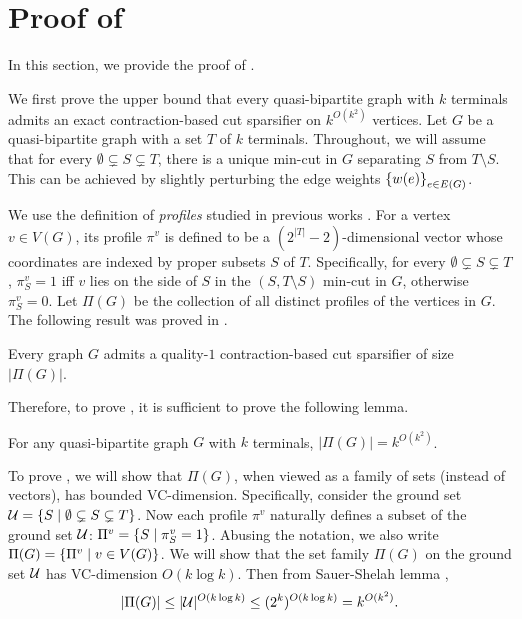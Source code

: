 \section{Proof of }
\label{sec: quasi_exact}

In this section, we provide the proof of . 

We first prove the upper bound that every quasi-bipartite graph with $k$ terminals admits an exact contraction-based cut sparsifier on $k^{O(k^2)}$ vertices. 
Let $G$ be a quasi-bipartite graph with a set $T$ of $k$ terminals.
Throughout, we will assume that for every $\emptyset \subsetneq S\subsetneq T$, there is a unique min-cut in $G$ separating $S$ from $T\setminus S$. This can be achieved by slightly perturbing the edge weights $\left\{ w(e) \right\}_{e\in E(G)}$.

We use the definition of \emph{profiles} studied in previous works \cite{hagerup1998characterizing,khan2014mimicking}.
For a vertex $v\in V(G)$, its profile $\pi^v$ is defined to be a $(2^{|T|}-2)$-dimensional vector whose coordinates are indexed by proper subsets $S$ of $T$. Specifically, for every $\emptyset \subsetneq S\subsetneq T$, $\pi^v_S=1$ iff $v$ lies on the side of $S$ in the $(S,T \setminus S)$ min-cut in $G$, otherwise $\pi^v_S=0$. 
Let $\Pi(G)$ be the collection of all distinct profiles of the vertices in $G$.
The following result was proved in \cite{hagerup1998characterizing}.

\begin{lemma}
Every graph $G$ admits a quality-$1$ contraction-based cut sparsifier of size $|\Pi(G)|$.
\end{lemma}

Therefore, to prove , it is sufficient to prove the following lemma.

\begin{lemma} \label{quasi_profile}
For any quasi-bipartite graph $G$ with $k$ terminals, $|\Pi(G)|=k^{O(k^2)}$.
\end{lemma}

To prove , we will show that $\Pi(G)$, when viewed as a family of sets (instead of vectors), has bounded VC-dimension.
Specifically, consider the ground set ${\mathcal U}=\left\{ S\mid \emptyset \subsetneq S\subsetneq T \right\}$.
Now each profile $\pi^v$ naturally defines a subset of the ground set ${\mathcal U}$: $\Pi^v=\left\{ S\mid \pi^v_S=1 \right\}$.
Abusing the notation, we also write $\Pi(G)=\left\{ \Pi^v\mid v\in V(G) \right\}$.
We will show that the set family $\Pi(G)$ on the ground set ${\mathcal U}$ has VC-dimension $O(k \log k)$. Then from Sauer-Shelah lemma \cite{shelah1972combinatorial,sauer1972density},  
$$|\Pi(G)|\le |{\mathcal U}|^{O(k \log k)}\le (2^k)^{O(k \log k)} = k^{O(k^2)}.$$  

